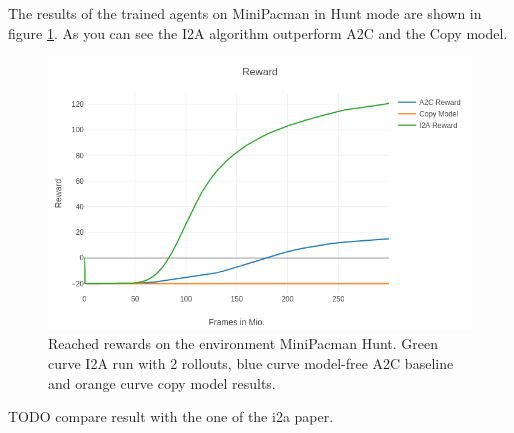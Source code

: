 The results of the trained agents on MiniPacman in Hunt mode are shown in figure \ref{fig:mini_pacman_hunt_rewards}. As you can see the I2A algorithm outperform A2C and the Copy model.


\begin{figure}[H] 
  \centering   
  \includegraphics[width=0.9\columnwidth]{./Images/hunt_rewards_compare.png}
  \caption{Reached rewards on the environment MiniPacman Hunt. Green curve I2A run with 2 rollouts, blue curve model-free A2C baseline and orange curve copy model results.} 
  \label{fig:mini_pacman_hunt_rewards} 
\end{figure} 

TODO compare result with the one of the i2a paper.